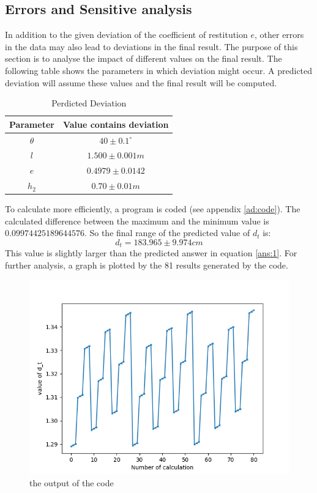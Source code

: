 \documentclass[conference]{IEEEtran}
\begin{document}
    \subsection{Errors and Sensitive analysis}
    In addition to the given deviation of the coefficient of restitution $e$, other errors in the data may also lead to deviations in the final result. The purpose of this section is to analyse the impact of different values on the final result. The following table shows the parameters in which deviation might occur. A predicted deviation will assume these values and the final result will be computed.
    \begin{table}[H]
                \caption {Perdicted Deviation} \label{tb:deviation} 
                \begin{center}
                    \begin{tabular}{cc}
                        \hline
                        Parameter & Value contains deviation \\
                        \hline
                        $\theta$     & $40\pm0.1^ \circ$     \\
                        $l$         & $1.500\pm 0.001m$     \\
                        $e$         & $0.4979 \pm 0.0142$     \\
                        $h_2$        & $0.70\pm0.01m$     \\
                        \hline
                    \end{tabular}
                \end{center}
            \end{table}
    To calculate more efficiently, a program is coded (see appendix \ref{ad:code}).
    The calculated difference between the maximum and the minimum value is $0.09974425189644576$. So the final range of the predicted value of $d_t$ is:
    $$d_t = 183.965\pm9.974cm$$
    This value is slightly larger than the predicted answer in equation \ref{ans:1}. For further analysis, a graph is plotted by the 81 results generated by the code. 
    \begin{figure}[H]
        \centering
        \includegraphics[width=0.75\linewidth]{code_output.png}
        \caption{the output of the code}
        \label{fig:code_output}
    \end{figure}
\end{document}
